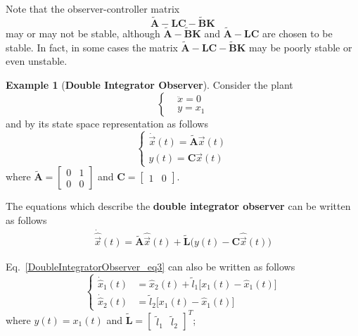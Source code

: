 \documentclass[11pt,a4paper,oneside]{book}
\numberwithin{equation}{section}
\theoremstyle{it}
\theoremstyle{definition}
\newtheorem{example}{Example}[chapter]
\begin{document}
\vspace{5mm}
Note that the observer-controller matrix
\begin{equation}
	\tilde{\mathbf{A}} - \mathbf{LC} - \tilde{\mathbf{B}}\mathbf{K} 
\end{equation} 
may or may not be stable, although 
$\tilde{\mathbf{A}}-\tilde{\mathbf{B}}\mathbf{K}$ and $\tilde{\mathbf{A}} - 
\mathbf{LC}$ are 
chosen to be stable. In fact, in some cases the matrix 
$\tilde{\mathbf{A}}-\mathbf{LC}-\tilde{\mathbf{B}}\mathbf{K}$ may 
be poorly stable or even unstable.

\vspace{5mm}
\begin{example}[\textbf{Double Integrator Observer}]\label{DoubleIntegratorObserver}
Consider the plant
\begin{equation}\label{DoubleIntegratorObserver_eq1}
	\left\lbrace \begin{aligned}
		&\ddot{x}=0 \\
		&y=x_1
	\end{aligned}\right. 
\end{equation}
and by its state space representation as follows
\begin{equation}\label{DoubleIntegratorObserver_eq2}
	\left\lbrace \begin{aligned}
		\dot{\vec{x}}(t)=\tilde{\mathbf{A}}\vec{x}(t) \\[6pt]
		y(t)=\mathbf{C}\vec{x}(t)
	\end{aligned}\right. 
\end{equation}
where $\tilde{\mathbf{A}}=\begin{bmatrix} 0&1\\0&0 \end{bmatrix}$ and 
$\mathbf{C}=\begin{bmatrix} 1&0 \end{bmatrix}$.

The equations which describe the \textbf{double integrator observer} can be 
written as follows
\begin{equation}\label{DoubleIntegratorObserver_eq3}
	\begin{aligned}
		\dot{\hat{\vec{x}}}(t)=\tilde{\mathbf{A}}\hat{\vec{x}}(t)+\tilde{\mathbf{L}}\Big(y(t)-\mathbf{C}\hat{\vec{x}}(t)\Big)
	\end{aligned}
\end{equation}

Eq.~\eqref{DoubleIntegratorObserver_eq3} can also be written as follows
\begin{equation}\label{DoubleIntegratorObserver_eq4}
	\left\lbrace \begin{aligned}
		\dot{\hat{x}}_1(t) &= \hat{x}_2(t) + \tilde{l}_1\Big[x_1(t) - 
		\hat{x}_1(t)\Big] 
		\\[6pt]
		\dot{\hat{x}}_2(t) &= \tilde{l}_2\Big[x_1(t) - \hat{x}_1(t) \Big]
	\end{aligned}\right. 
\end{equation}
where $y(t) = x_1(t)$ and $\tilde{\mathbf{L}}=\begin{bmatrix} 
\tilde{l}_1&\tilde{l}_2 \end{bmatrix}^T$;


\end{example}
\end{document}
